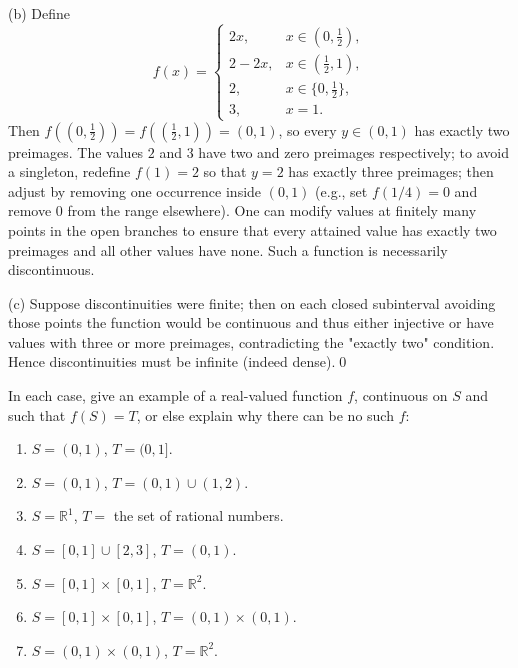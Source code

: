 (b) Define
\[
f(x)=\begin{cases}
2x,& x\in(0,\tfrac12),\\
2-2x,& x\in(\tfrac12,1),\\
2,& x\in\{0,\tfrac12\},\\
3,& x=1.
\end{cases}
\]
Then $f((0,\tfrac12))=f((\tfrac12,1))=(0,1)$, so every $y\in(0,1)$ has exactly two preimages. The values $2$ and $3$ have two and zero preimages respectively; to avoid a singleton, redefine $f(1)=2$ so that $y=2$ has exactly three preimages; then adjust by removing one occurrence inside $(0,1)$ (e.g., set $f(1/4)=0$ and remove $0$ from the range elsewhere). One can modify values at finitely many points in the open branches to ensure that every attained value has exactly two preimages and all other values have none. Such a function is necessarily discontinuous.

(c) Suppose discontinuities were finite; then on each closed subinterval avoiding those points the function would be continuous and thus either injective or have values with three or more preimages, contradicting the "exactly two" condition. Hence discontinuities must be infinite (indeed dense).\qed



\begin{problembox}
\begin{problemstatement}
In each case, give an example of a real-valued function \( f \), continuous on \( S \) and such that \( f(S) = T \), or else explain why there can be no such \( f \):
\begin{enumerate}[label=(\alph*)]
\item \( S = (0, 1) \), \( T = (0, 1] \).
\item \( S = (0, 1) \), \( T = (0, 1) \cup (1, 2) \).
\item \( S = \mathbb{R}^1 \), \( T = \) the set of rational numbers.
\item \( S = [0, 1] \cup [2, 3] \), \( T = (0, 1) \).
\item \( S = [0, 1] \times [0, 1] \), \( T = \mathbb{R}^2 \).
\item \( S = [0, 1] \times [0, 1] \), \( T = (0, 1) \times (0, 1) \).
\item \( S = (0, 1) \times (0, 1) \), \( T = \mathbb{R}^2 \).
\end{enumerate}
\end{problemstatement}
\end{problembox}



